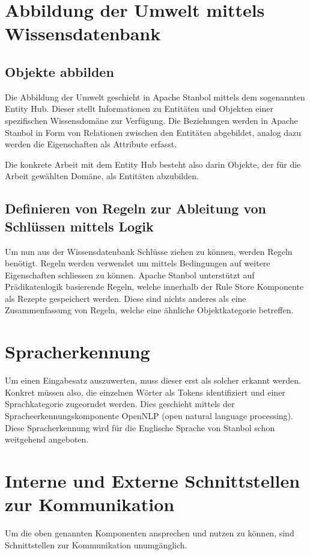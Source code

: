 \section{Abbildung der Umwelt mittels Wissensdatenbank}
\label{sec:architektur_wissensdatenbank}
\subsection{Objekte abbilden}
\label{subsec:architektur_wissensdatenbank_Objekte}
Die Abbildung der Umwelt geschieht in Apache Stanbol mittels dem sogenannten Entity Hub.
Dieser stellt Informationen zu Entitäten und Objekten einer spezifischen Wissensdomäne zur Verfügung. Die Beziehungen werden in Apache Stanbol in Form von Relationen zwischen den Entitäten abgebildet, analog dazu werden die Eigenschaften als Attribute erfasst. 

Die konkrete Arbeit mit dem Entity Hub besteht also darin Objekte, der für die Arbeit gewählten Domäne, als Entitäten abzubilden.

\subsection{Definieren von Regeln zur Ableitung von Schlüssen mittels Logik}
\label{sec:architektur_regeln}
Um nun aus der Wissensdatenbank Schlüsse ziehen zu können, werden Regeln benötigt. Regeln werden verwendet um mittels Bedingungen auf weitere Eigenschaften schliessen zu können.
Apache Stanbol unterstützt auf Prädikatenlogik basierende Regeln, welche innerhalb der Rule Store Komponente als Rezepte gespeichert werden. Diese sind nichts anderes als eine Zusammenfassung von Regeln, welche eine ähnliche Objektkategorie betreffen.

\section{Spracherkennung}
\label{sec:architektur_spracherkennung}
Um einen Eingabesatz auszuwerten, muss dieser erst als solcher erkannt werden. Konkret müssen also, die einzelnen Wörter als Tokens identifiziert und einer Sprachkategorie zugeorndet werden. Dies geschieht mittels der Spracheerkennungskomponente OpenNLP (open natural language processing). Diese Spracherkennung wird für die Englische Sprache von Stanbol schon weitgehend angeboten.


\section{Interne und Externe Schnittstellen zur Kommunikation}
\label{sec:architektur_schnittstellen}
Um die oben genannten Komponenten ansprechen und nutzen zu können, sind Schnittstellen zur Kommunikation unumgänglich.

